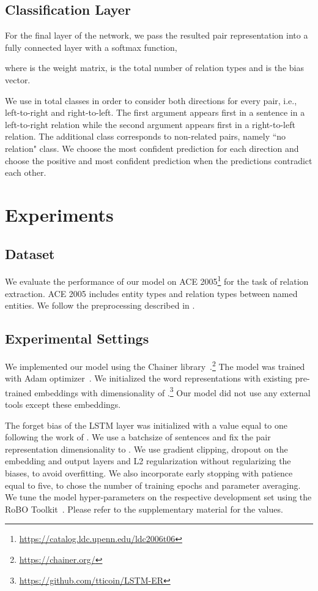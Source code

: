 \documentclass[11pt,a4paper]{article}
\begin{document}
\subsection{Classification Layer}
    
	For the final layer of the network, we pass the resulted pair representation into a fully connected layer with a softmax function,
	
	where  is the weight matrix, 
	 is the total number of relation types  
	and  is the bias vector.
	
	We use in total  classes in order to consider both directions for every pair, i.e., left-to-right and right-to-left. The first argument appears first in a sentence in a left-to-right relation while the second argument appears first in a right-to-left relation. The additional class corresponds to non-related pairs, namely ``no relation" class.
	We choose the most confident prediction for each direction and choose the positive and most confident prediction when the predictions contradict each other.
	
	
\section{Experiments}
	
	\subsection{Dataset}
    
	We evaluate the performance of our model on ACE 2005\footnote{\url{https://catalog.ldc.upenn.edu/ldc2006t06}} for the task of relation extraction.
	ACE 2005 includes  entity types and  relation types between named entities.  
	We follow the preprocessing described in \citet{miwa2016end}.

	\subsection{Experimental Settings}
    
	We implemented our model using the Chainer library~\citep{tokui2015chainer}.\footnote{\url{https://chainer.org/}} 
	The model was trained with Adam optimizer~\citep{kingma2014adam}. 
	We initialized the word representations with existing pre-trained embeddings with dimensionality of .\footnote{\url{https://github.com/tticoin/LSTM-ER}}
    Our model did not use any external tools except these embeddings.
    
	The forget bias of the LSTM layer was initialized with a value equal to one following the work of \citet{jozefowicz2015empirical}. 
	We use a batchsize of  sentences and fix the pair representation dimensionality to . We use gradient clipping, dropout on the embedding and output layers and L2 regularization without regularizing the biases, to avoid overfitting. We also incorporate early stopping with patience equal to five, to chose the number of training epochs and parameter averaging.
	We tune the model hyper-parameters on the respective development set using the RoBO Toolkit~\cite{klein-bayesopt17}. 
	Please refer to the supplementary material for the values.
	
\end{document}
